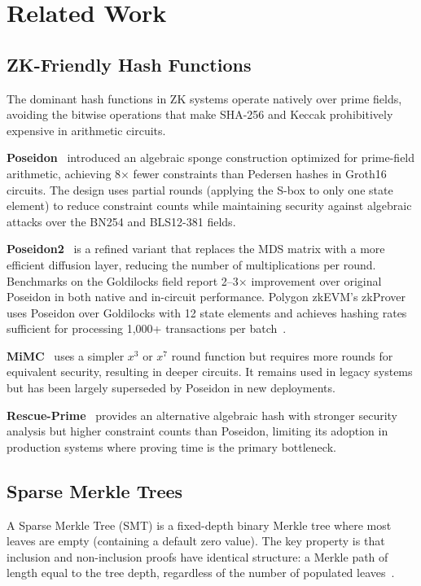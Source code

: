 \section{Related Work}
\label{sec:related-work}

\subsection{ZK-Friendly Hash Functions}

The dominant hash functions in ZK systems operate natively over prime
fields, avoiding the bitwise operations that make SHA-256 and Keccak
prohibitively expensive in arithmetic circuits.

\textbf{Poseidon}~\cite{grassi2021poseidon} introduced an
algebraic sponge construction optimized for prime-field arithmetic,
achieving 8$\times$ fewer constraints than Pedersen hashes in Groth16
circuits. The design uses partial rounds (applying the S-box to only
one state element) to reduce constraint counts while maintaining
security against algebraic attacks over the BN254 and BLS12-381 fields.

\textbf{Poseidon2}~\cite{grassi2023poseidon2} is a refined variant
that replaces the MDS matrix with a more efficient diffusion layer,
reducing the number of multiplications per round. Benchmarks on the
Goldilocks field report 2--3$\times$ improvement over original
Poseidon in both native and in-circuit performance. Polygon zkEVM's
zkProver uses Poseidon over Goldilocks with 12 state elements and
achieves hashing rates sufficient for processing 1,000+ transactions
per batch~\cite{polygon2024zkprover}.

\textbf{MiMC}~\cite{albrecht2016mimc} uses a simpler $x^3$ or $x^7$
round function but requires more rounds for equivalent security,
resulting in deeper circuits. It remains used in legacy systems but
has been largely superseded by Poseidon in new deployments.

\textbf{Rescue-Prime}~\cite{aly2020rescue} provides an alternative
algebraic hash with stronger security analysis but higher constraint
counts than Poseidon, limiting its adoption in production systems
where proving time is the primary bottleneck.

\subsection{Sparse Merkle Trees}

A Sparse Merkle Tree (SMT) is a fixed-depth binary Merkle tree where
most leaves are empty (containing a default zero value). The key
property is that inclusion and non-inclusion proofs have identical
structure: a Merkle path of length equal to the tree depth,
regardless of the number of populated leaves~\cite{laurie2012revocation}.

